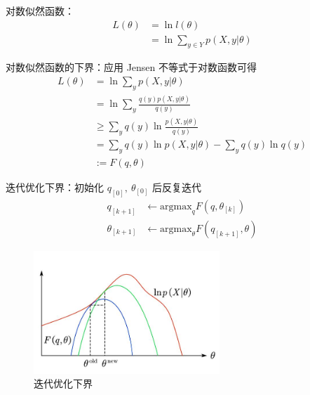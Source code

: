 \documentclass[openany]{ctexbook}
\theoremstyle{kaiti}
\theoremstyle{normal}
\begin{document}
对数似然函数：
\begin{equation}
\begin{aligned}
  L(\theta)
  &=\ln l(\theta)\\
  &=\ln \sum_{y\in Y}p\left(X,y|\theta \right)
\end{aligned}
\end{equation}

对数似然函数的下界：应用 Jensen 不等式于对数函数可得
\begin{equation}
\begin{aligned}
  L(\theta)
  &=\ln \sum_yp\left(X,y|\theta \right)\\
  &=\ln \sum_y\frac{q(y)p\left(X,y|\theta \right)}{q(y)}\\
  &\geqslant \sum_yq(y)\ln\frac{p\left(X,y|\theta \right)}{q(y)} \\
  &=\sum_yq(y)\ln p\left(X,y|\theta \right)-\sum_yq(y)\ln q(y)\\
  &:=F\left(q,\theta \right)
\end{aligned}
\end{equation}

迭代优化下界：初始化 $q_{\left[0 \right]},~\theta_{\left[0 \right]}$ 后反复迭代
\begin{equation}
\begin{aligned}
  q_{\left[k+1 \right]}&\gets \mathrm{argmax}_qF\left(q,\theta_{\left[k \right]} \right)\\
  \theta_{\left[k+1 \right]}&\gets \mathrm{argmax}_{\theta}F\left(q_{\left[k+1 \right]},\theta \right)
\end{aligned}
\end{equation}

\begin{figure}
  \centering
  \includegraphics[width=7cm]{1627808293080-3.1.jpg}
  \caption{迭代优化下界}
\end{figure}
\end{document}
